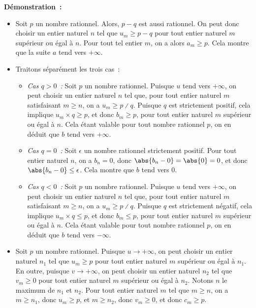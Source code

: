 \noindent\textbf{Démonstration :} 
\begin{itemize}[nosep]
    \item Soit $p$ un nombre rationnel.
        Alors, $p - q$ est aussi rationnel.
        On peut donc choisir un entier naturel $n$ tel que $u_m \geq p - q$ pour tout entier naturel $m$ supérieur ou égal à $n$. 
        Pour tout tel entier $m$, on a alors $a_m \geq p$.
        Cela montre que la suite $a$ tend vers $+\infty$.
    \item Traitons séparément les trois cas : 
        \begin{itemize}[nosep]
            \item \emph{Cas $q > 0$ :} Soit $p$ un nombre rationnel.
                Puisque $u$ tend vers $+\infty$, on peut choisir un entier naturel $n$ tel que, pour tout entier naturel $m$ satisfaisant $m \geq n$, on a $u_m \geq p \divslash q$.
                Puisque $q$ est strictement positif, cela implique $u_m \times q \geq p$, et donc $b_m \geq p$, pour tout entier naturel $m$ supérieur ou égal à $n$.
                Cela étant valable pour tout nombre rationnel $p$, on en déduit que $b$ tend vers $+\infty$.
            \item \emph{Cas $q = 0$ :} Soit $\epsilon$ un nombre rationnel strictement positif. Pour tout entier naturel $n$, on a $b_n = 0$, donc $\abs{b_n - 0} = \abs{0} = 0$, et donc $\abs{b_n - 0} \leq \epsilon$.
                Cela montre que $b$ tend vers $0$.
            \item \emph{Cas $q < 0$ :} Soit $p$ un nombre rationnel.
                Puisque $u$ tend vers $+\infty$, on peut choisir un entier naturel $n$ tel que, pour tout entier naturel $m$ satisfaisant $m \geq n$, on a $u_m \geq p \divslash q$.
                Puisque $q$ est strictement négatif, cela implique $u_m \times q \leq p$, et donc $b_m \leq p$, pour tout entier naturel $m$ supérieur ou égal à $n$.
                Cela étant valable pour tout nombre rationnel $p$, on en déduit que $b$ tend vers $-\infty$.
        \end{itemize}
    \item Soit $p$ un nombre rationnel.
        Puisque $u \rightarrow +\infty$, on peut choisir un entier naturel $n_1$ tel que $u_m \geq p$ pour tout entier naturel $m$ supérieur ou égal à $n_1$.
        En outre, puisque $v \rightarrow +\infty$, on peut choisir un entier naturel $n_2$ tel que $v_m \geq 0$ pour tout entier naturel $m$ supérieur ou égal à $n_2$.
        Notons $n$ le maximum de $n_1$ et $n_2$.
        Pour tout entier naturel $m$ tel que $m \geq n$, on a $m \geq n_1$, donc $u_m \geq p$, et $m \geq n_2$, donc $v_m \geq 0$, et donc $c_m \geq p$.

\end{itemize}
